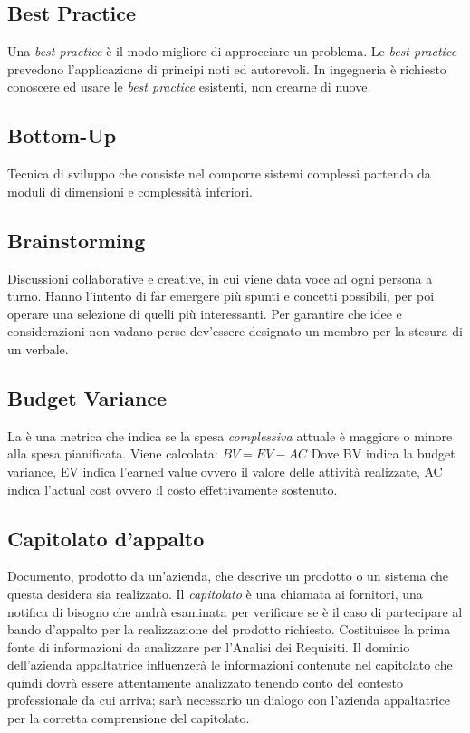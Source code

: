 	
	\subsection{Best Practice}
	\label{sec:bestpractice}
	Una \emph{best practice} è il modo migliore di approcciare un problema. Le \emph{best practice} prevedono l'applicazione di principi noti ed autorevoli. In ingegneria è richiesto conoscere ed usare le \emph{best practice} esistenti, non crearne di nuove.


	\subsection{Bottom-Up}
	\label{sec:bottomup}
	Tecnica di sviluppo che consiste nel comporre sistemi complessi partendo da moduli di dimensioni e complessità inferiori.
	
	
	\subsection{Brainstorming}
	\label{sec:brainstorming}
	Discussioni collaborative e creative, in cui viene data voce ad ogni persona a turno. Hanno l'intento di far emergere più spunti e concetti possibili, per poi operare una selezione di quelli più interessanti. Per garantire che idee e considerazioni non vadano perse dev'essere designato un membro per la stesura di un verbale.

	
	\subsection{Budget Variance}
	\label{sec:budgetvariance}
	La  è una metrica che indica se la spesa \textit{complessiva} attuale è maggiore o minore alla spesa pianificata. Viene calcolata: $BV = EV - AC$ Dove BV indica la budget variance, EV indica l'earned value ovvero il valore delle attività realizzate, AC indica l'actual cost ovvero il costo effettivamente sostenuto.
	
	\newpage

	
	\subsection{Capitolato d'appalto}
	\label{sec:capitolato}
	Documento, prodotto da un'azienda, che descrive un prodotto o un sistema che questa desidera sia realizzato. Il \emph{capitolato} è una chiamata ai fornitori, una notifica di bisogno che andrà esaminata per verificare se è il caso di partecipare al bando d'appalto per la realizzazione del prodotto richiesto. Costituisce la prima fonte di informazioni da analizzare per l'Analisi dei Requisiti. Il dominio dell'azienda appaltatrice influenzerà le informazioni contenute nel capitolato che quindi dovrà essere attentamente analizzato tenendo conto del contesto professionale da cui arriva; sarà necessario un dialogo con l'azienda appaltatrice per la corretta comprensione del capitolato.


